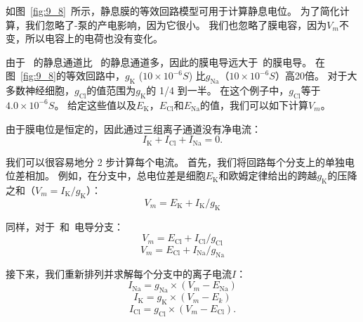 \begin{proposition}[利用等效回路模型计算静息膜电位] \label{box:9_2}
	
	\quad \quad 如图~\ref{fig:9_8}~所示，静息膜的等效回路模型可用于计算静息电位。
	为了简化计算，我们忽略了-泵的产电影响，因为它很小。
	我们也忽略了膜电容，因为$V_m$不变，所以电容上的电荷也没有变化。
	
	\quad \quad 由于~ 的静息通道比~ 的静息通道多，因此的膜电导远大于~的膜电导。
	在图~\ref{fig:9_8}的等效回路中，$ g_\text{K} $ ($ 10\times 10^{-6} S $) 比$ g_\text{Na} $（$ 10 \times 10^{-6} S $）高20倍。
	对于大多数神经细胞，$ g_\text{Cl} $的值范围为$ g_\text{K} $的 1/4 到一半。
	在这个例子中，$ g_\text{Cl} $等于 $ 4.0 \times 10^{-6} S $。
	给定这些值以及$E_\text{K}$，$E_\text{Cl}$和$ E_\text{Na} $的值，我们可以如下计算$V_m$。
	
	\quad \quad 由于膜电位是恒定的，因此通过三组离子通道没有净电流：
	\begin{equation}\label{eq:9_three_sets}
		I_\text{K} + I_\text{Cl} + I_\text{Na} = 0.
	\end{equation}
	
	\quad \quad 我们可以很容易地分 2 步计算每个电流。
	首先，我们将回路每个分支上的单独电位差相加。
	例如，在分支中，总电位差是细胞$E_\text{K}$和欧姆定律给出的跨越$ g_\text{K} $的压降之和（$ V_m = I_\text{K} / g_\text{K} $）：
	\begin{equation}\label{eq:9_voltage_drop}
		V_m = E_\text{K} + I_\text{K} / g_\text{K}
	\end{equation}
	
	\quad \quad 同样，对于~和~电导分支：
	\begin{equation}\label{eq:9_Na_conductance}
		V_m = E_\text{Cl} + I_\text{Cl} / g_\text{Cl}
	\end{equation}
	\begin{equation}\label{eq:9_Cl_conductance}
		V_m = E_\text{Cl} + I_\text{Na} / g_\text{Na}
	\end{equation}
	
	\quad \quad 接下来，我们重新排列并求解每个分支中的离子电流$ I $：
	\begin{equation}\label{eq:9_ionic_current_Na}
		I_\text{Na} = g_\text{Na} \times (V_m - E_\text{Na})
	\end{equation}
	\begin{equation}\label{eq:9_ionic_current_K}
		I_\text{K} = g_\text{K} \times (V_m - E_k)
	\end{equation}
	\begin{equation}\label{eq:9_ionic_current_Cl}
		I_\text{Cl} = g_\text{Cl} \times (V_m - E_\text{Cl}).
	\end{equation}
	

\end{proposition}
